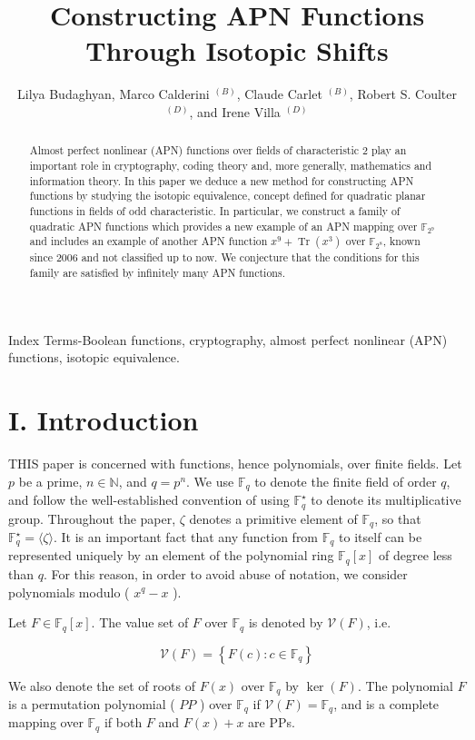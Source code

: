 \documentclass[10pt]{article}
\title{Constructing APN Functions Through Isotopic Shifts }
\author{Lilya Budaghyan, Marco Calderini ${ }^{(B)}$, Claude Carlet ${ }^{(B)}$, Robert S. Coulter ${ }^{(D)}$, and Irene Villa ${ }^{(D)}$}
\date{}
\begin{document}
\maketitle
\captionsetup{singlelinecheck=false}


\begin{abstract}
Almost perfect nonlinear (APN) functions over fields of characteristic 2 play an important role in cryptography, coding theory and, more generally, mathematics and information theory. In this paper we deduce a new method for constructing APN functions by studying the isotopic equivalence, concept defined for quadratic planar functions in fields of odd characteristic. In particular, we construct a family of quadratic APN functions which provides a new example of an APN mapping over $\mathbb{F}_{2^{9}}$ and includes an example of another APN function $x^{9}+\operatorname{Tr}\left(x^{3}\right)$ over $\mathbb{F}_{2^{8}}$, known since 2006 and not classified up to now. We conjecture that the conditions for this family are satisfied by infinitely many APN functions.
\end{abstract}

Index Terms-Boolean functions, cryptography, almost perfect nonlinear (APN) functions, isotopic equivalence.

\section*{I. Introduction}
THIS paper is concerned with functions, hence polynomials, over finite fields. Let $p$ be a prime, $n \in \mathbb{N}$, and $q=p^{n}$. We use $\mathbb{F}_{q}$ to denote the finite field of order $q$, and follow the well-established convention of using $\mathbb{F}_{q}^{\star}$ to denote its multiplicative group. Throughout the paper, $\zeta$ denotes a primitive element of $\mathbb{F}_{q}$, so that $\mathbb{F}_{q}^{\star}=\langle\zeta\rangle$. It is an important fact that any function from $\mathbb{F}_{q}$ to itself can be represented uniquely by an element of the polynomial ring $\mathbb{F}_{q}[x]$ of degree less than $q$. For this reason, in order to avoid abuse of notation, we consider polynomials modulo ( $x^{q}-x$ ).

Let $F \in \mathbb{F}_{q}[x]$. The value set of $F$ over $\mathbb{F}_{q}$ is denoted by $\mathcal{V}(F)$, i.e.

$$
\mathcal{V}(F)=\left\{F(c): c \in \mathbb{F}_{q}\right\}
$$

We also denote the set of roots of $F(x)$ over $\mathbb{F}_{q}$ by $\operatorname{ker}(F)$. The polynomial $F$ is a permutation polynomial ( $P P$ ) over $\mathbb{F}_{q}$ if $\mathcal{V}(F)=\mathbb{F}_{q}$, and is a complete mapping over $\mathbb{F}_{q}$ if both $F$ and $F(x)+x$ are PPs.
\end{document}
